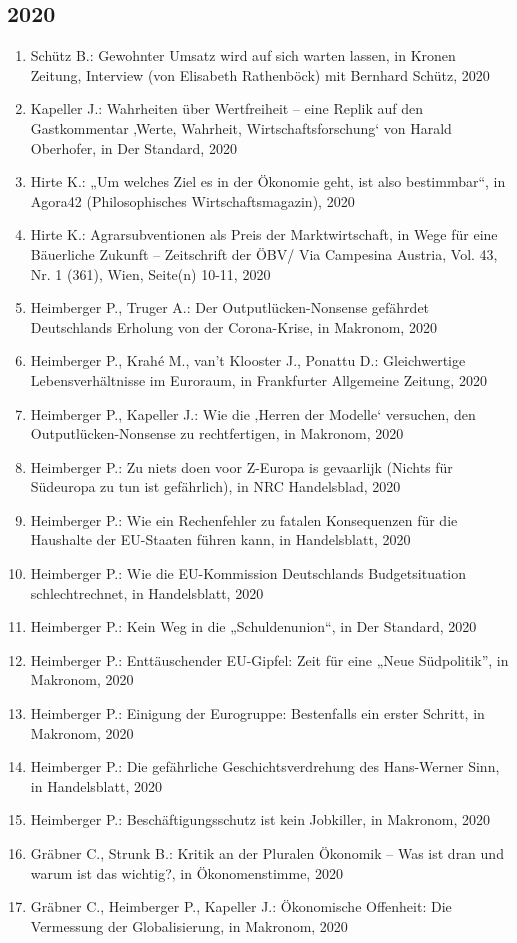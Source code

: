 \subsection*{2020}
\begin{enumerate}
    	 \item Schütz B.: Gewohnter Umsatz wird auf sich warten lassen, in Kronen Zeitung, Interview (von Elisabeth Rathenböck) mit Bernhard Schütz, 2020
	 \item Kapeller J.: Wahrheiten über Wertfreiheit – eine Replik auf den Gastkommentar ‚Werte, Wahrheit, Wirtschaftsforschung‘ von Harald Oberhofer, in Der Standard, 2020
	 \item Hirte K.: „Um welches Ziel es in der Ökonomie geht, ist also bestimmbar“, in Agora42 (Philosophisches Wirtschaftsmagazin), 2020
	 \item Hirte K.: Agrarsubventionen als Preis der Marktwirtschaft, in Wege für eine Bäuerliche Zukunft – Zeitschrift der ÖBV/ Via Campesina Austria, Vol. 43, Nr. 1 (361), Wien, Seite(n) 10-11, 2020
	 \item Heimberger P., Truger A.: Der Outputlücken-Nonsense gefährdet Deutschlands Erholung von der Corona-Krise, in Makronom, 2020
	 \item Heimberger P., Krahé M., van't Klooster J., Ponattu D.: Gleichwertige Lebensverhältnisse im Euroraum, in Frankfurter Allgemeine Zeitung, 2020
	 \item Heimberger P., Kapeller J.: Wie die ‚Herren der Modelle‘ versuchen, den Outputlücken-Nonsense zu rechtfertigen, in Makronom, 2020
	 \item Heimberger P.: Zu niets doen voor Z-Europa is gevaarlijk (Nichts für Südeuropa zu tun ist gefährlich), in NRC Handelsblad, 2020
	 \item Heimberger P.: Wie ein Rechenfehler zu fatalen Konsequenzen für die Haushalte der EU-Staaten führen kann, in Handelsblatt, 2020
	 \item Heimberger P.: Wie die EU-Kommission Deutschlands Budgetsituation schlechtrechnet, in Handelsblatt, 2020
	 \item Heimberger P.: Kein Weg in die „Schuldenunion“, in Der Standard, 2020
	 \item Heimberger P.: Enttäuschender EU-Gipfel: Zeit für eine „Neue Südpolitik”, in Makronom, 2020
	 \item Heimberger P.: Einigung der Eurogruppe: Bestenfalls ein erster Schritt, in Makronom, 2020
	 \item Heimberger P.: Die gefährliche Geschichtsverdrehung des Hans-Werner Sinn, in Handelsblatt, 2020
	 \item Heimberger P.: Beschäftigungsschutz ist kein Jobkiller, in Makronom, 2020
	 \item Gräbner C., Strunk B.: Kritik an der Pluralen Ökonomik – Was ist dran und warum ist das wichtig?, in Ökonomenstimme, 2020
	 \item Gräbner C., Heimberger P., Kapeller J.: Ökonomische Offenheit: Die Vermessung der Globalisierung, in Makronom, 2020
\end{enumerate}
